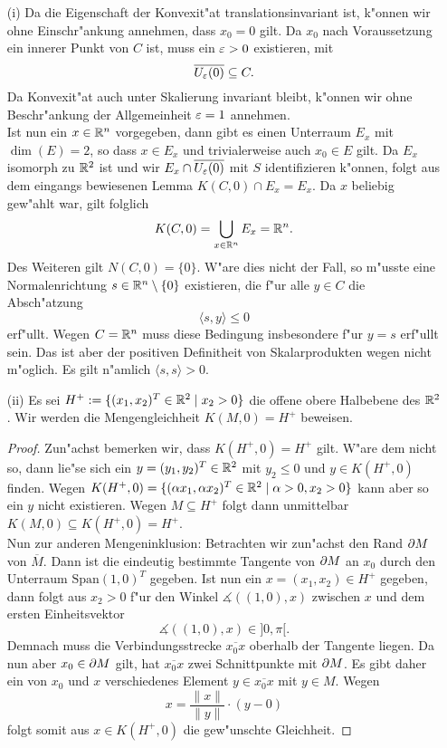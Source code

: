 \begin{itemize}
\item [(i)]
Da die Eigenschaft der Konvexit"at translationsinvariant
ist, k"onnen wir ohne Einschr"ankung annehmen, dass $x_0 = 0$ gilt. Da $x_0$
nach Voraussetzung ein innerer Punkt von $C$ ist, muss ein $\varepsilon > 0$ existieren,
mit
\[
\overline{U_\varepsilon (0)} \subseteq C.
\]
Da Konvexit"at auch unter Skalierung invariant bleibt, k"onnen wir ohne Beschr"ankung
der Allgemeinheit $\varepsilon = 1$ annehmen.\\

Ist nun ein $x\in\mathbb{R}^n$ vorgegeben, dann gibt es einen Unterraum $E_x$ mit $\dim(E)=2$,
so dass $x \in E_x$ und trivialerweise auch $x_0 \in E$ gilt. Da $E_x$ isomorph zu $\mathbb{R}^2$
ist und wir $E_x \cap \overline{U_\varepsilon (0)}$ mit $S$ identifizieren k"onnen,
folgt aus dem eingangs bewiesenen Lemma $K(C,0)\cap E_x = E_x$. Da $x$ beliebig
gew"ahlt war, gilt folglich
\[
K(C,0) = \bigcup_{x\in\mathbb{R}^n} E_x = \mathbb{R}^n.
\]
Des Weiteren gilt $N(C,0) = \{0\}$. W"are dies nicht der Fall, so m"usste eine
Normalenrichtung $s\in\mathbb{R}^n\setminus\{0\}$ existieren, die f"ur alle $y\in C$ die Absch"atzung
\[
\langle s, y \rangle \le 0
\]
erf"ullt. Wegen $C = \mathbb{R}^n$ muss diese Bedingung insbesondere f"ur $y = s$ erf"ullt
sein. Das ist aber der positiven Definitheit von Skalarprodukten wegen nicht m"oglich.
Es gilt n"amlich $\langle s,s \rangle > 0$.

\item[(ii)] Es sei $H^+ := \{(x_1, x_2)^T \in\mathbb{R}^2 \mid x_2 > 0\}$ die offene obere Halbebene
des $\mathbb{R}^2$. Wir werden die Mengengleichheit $K(M,0) = H^+$ beweisen.
\begin{proof}
Zun"achst bemerken wir, dass $K(H^+, 0) = H^+$ gilt. W"are dem nicht so, dann
lie"se sich ein $y = (y_1, y_2)^T \in \mathbb{R}^2$ mit $y_2 \le 0$ und $y\in K(H^+,0)$
finden. Wegen $K(H^+,0) = \{(\alpha x_1, \alpha x_2)^T \in \mathbb{R}^2 \mid \alpha > 0, x_2 > 0\}$ kann aber
so ein $y$ nicht existieren. Wegen $M\subseteq H^+$ folgt dann unmittelbar
$K(M, 0) \subseteq K(H^+, 0) = H^+$.\\

Nun zur anderen Mengeninklusion: Betrachten wir zun"achst den Rand $\partial{M}$
von $\overline{M}$. Dann ist die eindeutig bestimmte Tangente von $\partial{M}$ an $x_0$ durch den
Unterraum $\text{Span}{(1,0)^T}$ gegeben. Ist nun ein $x=(x_1, x_2)\in H^+$ gegeben,
dann folgt aus $x_2 > 0$ f"ur den Winkel $\measuredangle((1,0),x)$ zwischen $x$
und dem ersten Einheitsvektor
\[
\measuredangle((1,0),x) \in ]0,\pi[.
\]
Demnach
muss die Verbindungsstrecke $\overline {x_0 x}$ oberhalb der Tangente liegen.
Da nun aber $x_0 \in \partial{M}$ gilt, hat $\overline {x_0 x}$ zwei Schnittpunkte mit $\partial{M}$. Es gibt
daher ein von $x_0$ und $x$ verschiedenes Element $y \in \overline {x_0 x}$ mit
$y\in M$. Wegen
\[
x = \frac{\|x\|}{\|y\|}\cdot(y - 0)
\]
folgt somit aus $x\in K(H^+,0)$ die gew"unschte Gleichheit.
\end{proof}


\end{itemize}
